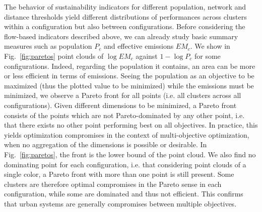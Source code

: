 \documentclass{jimis-en}
\begin{document}
The behavior of sustainability indicators for different population, network and distance thresholds yield different distributions of performances across clusters within a configuration but also between configurations. Before considering the flow-based indicators described above, we can already study basic summary measures such as population $P_c$ and effective emissions $EM_c$. We show in Fig.~\ref{fig:paretos} point clouds of $\log EM_c$ against $1 - \log P_c$ for some configurations. Indeed, regarding the population it contains, an area can be more or less efficient in terms of emissions. Seeing the population as an objective to be maximized (thus the plotted value to be minimized) while the emissions must be minimized, we observe a Pareto front for all points (i.e. all clusters across all configurations). Given different dimensions to be minimized, a Pareto front consists of the points which are not Pareto-dominated by any other point, i.e. that there exists no other point performing best on all objectives. In practice, this yields optimization compromises in the context of multi-objective optimization, when no aggregation of the dimensions is possible or desirable. In Fig.~\ref{fig:paretos}, the front is the lower bound of the point cloud. We also find no dominating point for each configuration, i.e. that considering point clouds of a single color, a Pareto front with more than one point is still present. Some clusters are therefore optimal compromises in the Pareto sense in each configuration, while some are dominated and thus not efficient. This confirms that urban systems are generally compromises between multiple objectives.
\end{document}
